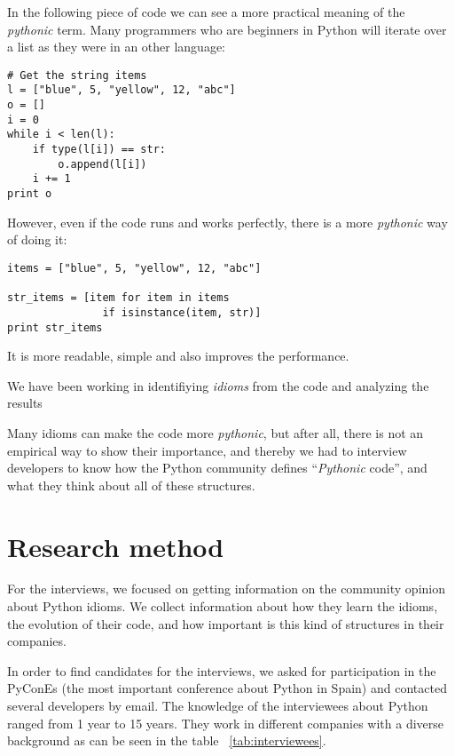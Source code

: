 \documentclass[a4paper]{article}
\begin{document}
In the following piece of code we can see a more practical meaning of the \textit{pythonic} term. Many programmers who are beginners in Python will iterate over a list as they were in an other language:

\begin{verbatim}
# Get the string items
l = ["blue", 5, "yellow", 12, "abc"]
o = []
i = 0
while i < len(l):
    if type(l[i]) == str:
        o.append(l[i])
    i += 1
print o
\end{verbatim}

However, even if the code runs and works perfectly, there is a more \emph{pythonic} way of doing it:

\begin{verbatim}
items = ["blue", 5, "yellow", 12, "abc"]

str_items = [item for item in items 
               if isinstance(item, str)]
print str_items
\end{verbatim}

It is more readable, simple and also improves the performance.


We have been working in identifiying \textit{idioms} from the code and analyzing the results~\cite{jjmerchante17sattose}

Many idioms can make the code more \textit{pythonic}, but after all, there is not an empirical way to show their importance, and thereby we had to interview developers to know how the Python community defines ``\textit{Pythonic} code'', and what they think about all of these structures.


\section{Research method}

For the interviews, we focused on getting information on the community opinion about Python idioms. We collect information about how they learn the idioms, the evolution of their code, and how important is this kind of structures in their companies.

In order to find candidates for the interviews, we asked for participation in the PyConEs (the most important conference about Python in Spain) and contacted several developers by email. The knowledge of the interviewees about Python ranged from 1 year to 15 years. They work in different companies with a diverse background as can be seen in the table ~\ref{tab:interviewees}.
\end{document}
